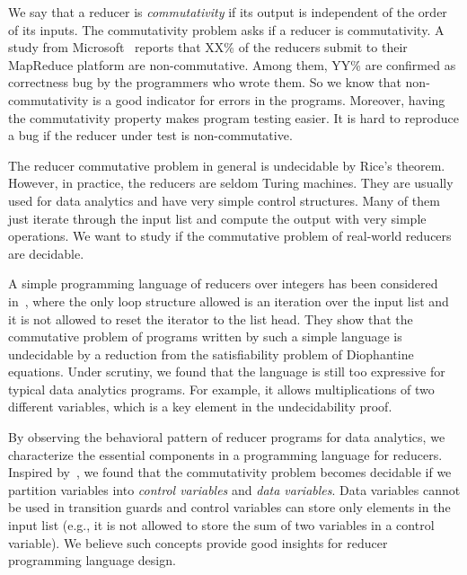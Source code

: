 \documentclass[runningheads,a4paper]{llncs}
\begin{document}
We say that a reducer is \emph{commutativity} if its output is independent of the order of its inputs. The commutativity problem asks if a reducer is commutativity. A study from Microsoft~\cite{XZZ+14} reports that XX\% of the reducers submit to their MapReduce platform are non-commutative. Among them, YY\% are confirmed as correctness bug by the programmers who wrote them. So we know that non-commutativity is a good indicator for errors in the programs. 
Moreover, having the commutativity property makes program testing easier. It is hard to reproduce a bug if the reducer under test is non-commutative. 

The reducer commutative problem in general is undecidable by Rice's theorem. However, in practice, the reducers are seldom Turing machines. They are usually used for data analytics and have very simple control structures. Many of them just iterate through the input list and compute the output with very simple operations.
We want to study if the commutative problem of real-world reducers are decidable.

A simple programming language of reducers over integers has been considered in~\cite{CHSW15}, where the only loop structure allowed is an iteration over the input list and it is not allowed to reset the iterator to the list head. They show that the commutative problem of programs written by such a simple language is undecidable by a reduction from the satisfiability problem of Diophantine equations. Under scrutiny, we found that the language is still too expressive for typical data analytics programs. For example, it allows multiplications of two different variables, which is a key element in the undecidability proof. 

By observing the behavioral pattern of reducer programs for data analytics, we characterize the essential components in a programming language for reducers. %
Inspired by~\cite{RP11}, we found that the commutativity problem becomes decidable if we partition variables into \emph{control variables} and \emph{data variables}. Data variables cannot be used in transition guards and control variables can store only elements in the input list (e.g., it is not allowed to store the sum of two variables in a control variable). 
We believe such concepts provide good insights for reducer programming language design.
\end{document}
